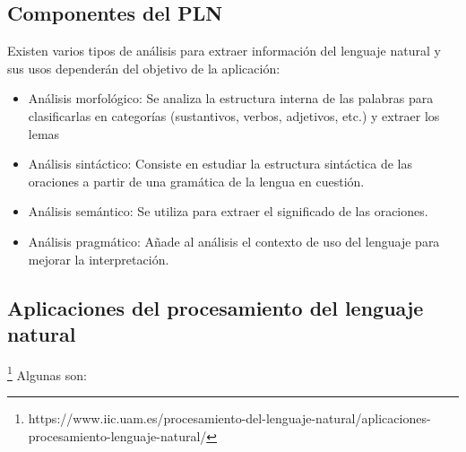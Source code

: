\subsection{Componentes del PLN}

Existen varios tipos de análisis para extraer información del lenguaje natural y sus usos dependerán del objetivo de la aplicación:

\begin{itemize}
	\item Análisis morfológico: Se analiza la estructura interna de las palabras para clasificarlas en categorías (sustantivos, verbos, adjetivos, etc.) y extraer los lemas 
	
	\item Análisis sintáctico: Consiste en estudiar la estructura sintáctica de las oraciones a partir de una gramática de la lengua en cuestión.
	
	\item Análisis semántico: Se utiliza para extraer el significado de las oraciones.
	
	\item Análisis pragmático: Añade al análisis el contexto de uso del lenguaje para mejorar la interpretación.
\end{itemize}



\subsection{Aplicaciones del procesamiento del lenguaje natural}

\footnote{https://www.iic.uam.es/procesamiento-del-lenguaje-natural/aplicaciones-procesamiento-lenguaje-natural/}
Algunas son:

